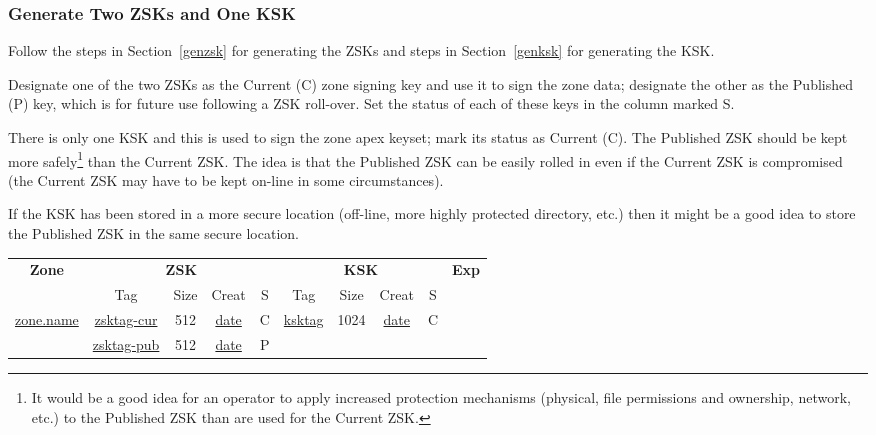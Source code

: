 
\subsubsection{Generate Two ZSKs and One KSK}

Follow the steps in Section~\ref{genzsk} for generating the ZSKs and steps in
Section~\ref{genksk} for generating the KSK.

Designate one of the two ZSKs as the Current (C) zone signing key and use it
to sign the zone data; designate the other as the Published (P) key, which
is for future use following a ZSK roll-over.  Set the status of each of these
keys in the column marked S.

There is only one KSK and this is used to sign the zone apex keyset; mark its
status as Current (C).  The Published ZSK should be kept more
safely\footnote{It would be a good idea for an operator to apply increased
protection mechanisms (physical, file permissions and ownership, network,
etc.) to the Published ZSK than are used for the Current ZSK.}
than the Current ZSK.  The idea is that the Published ZSK can be easily rolled
in even if the Current ZSK is compromised (the Current ZSK may have to be
kept on-line in some circumstances).

If the KSK has been stored in a more secure location (off-line, more highly
protected directory, etc.) then it might be a good idea to store the
Published ZSK in the same secure location.

\begin{center}
\begin{tabular}{|c|c|c|c|c|c|c|c|c|c|}
\hline
{\bf Zone} &
\multicolumn{4}{c|}{{\bf ZSK}} &
\multicolumn{4}{c|}{{\bf KSK}} &
{\bf Exp} \\
\cline{2-9}

 & Tag & Size & Creat & S & Tag & Size & Creat & S & \\
\hline

\underline{zone.name}	&
\underline{zsktag-cur}	&
512			&
\underline{date}	&
C			&
\underline{ksktag}	&
1024			&
\underline{date}	&
C			& \\

\cline{2-9}

			&
\underline{zsktag-pub}	&
512			&
\underline{date}	&
P			&
& & & & \\

\hline
\end{tabular}
\end{center}

